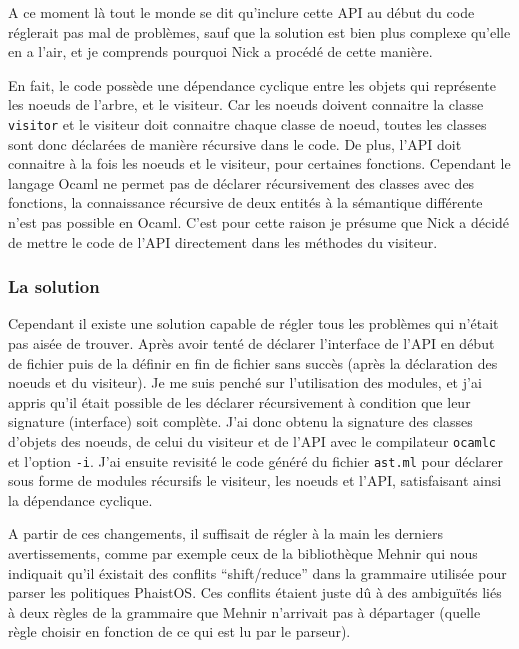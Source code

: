 A ce moment là tout le monde se dit qu'inclure cette API au début du code 
réglerait pas mal de problèmes, sauf que la solution est bien plus complexe 
qu'elle en a l'air, et je comprends pourquoi Nick a procédé de cette manière.

En fait, le code possède une dépendance cyclique entre les objets qui 
représente les noeuds de l'arbre, et le visiteur. Car les noeuds doivent 
connaitre la classe \texttt{visitor} et le visiteur doit connaitre chaque 
classe de noeud, toutes les classes sont donc déclarées de manière récursive 
dans le code. De plus, l'API doit connaitre à la fois les noeuds et le 
visiteur, pour certaines fonctions. Cependant le langage Ocaml ne permet pas de 
déclarer récursivement des classes avec des fonctions, la connaissance 
récursive de deux entités à la sémantique différente n'est pas possible en 
Ocaml. C'est pour cette raison je présume que Nick a décidé de mettre le code 
de l'API directement dans les méthodes du visiteur.

\subsubsection{La solution}
\label{solution}

Cependant il existe une solution capable de régler tous les problèmes qui 
n'était pas aisée de trouver. Après avoir tenté de déclarer l'interface de 
l'API en début de fichier puis de la définir en fin de fichier sans succès 
(après la déclaration des noeuds et du visiteur). Je me suis penché sur 
l'utilisation des modules, et j'ai appris qu'il était possible de les déclarer 
récursivement à condition que leur signature (interface) soit complète. J'ai 
donc obtenu la signature des classes d'objets des noeuds, de celui du visiteur 
et de l'API avec le compilateur \texttt{ocamlc} et l'option \texttt{-i}. J'ai 
ensuite revisité le code généré du fichier \texttt{ast.ml} pour déclarer sous 
forme de modules récursifs le visiteur, les noeuds et l'API, satisfaisant ainsi 
la dépendance cyclique.

A partir de ces changements, il suffisait de régler à la main les derniers 
avertissements, comme par exemple ceux de la bibliothèque Mehnir qui nous 
indiquait qu'il éxistait des conflits ``shift/reduce'' dans la grammaire 
utilisée pour parser les politiques PhaistOS. Ces conflits étaient juste dû à 
des ambiguïtés liés à deux règles de la grammaire que Mehnir n'arrivait pas à 
départager (quelle règle choisir en fonction de ce qui est lu par le parseur). 

